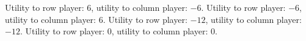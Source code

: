 \documentclass{exam}
\begin{document}
\begin{questions}
    \begin{checkboxes}
        \choice  Utility to row player: \(6\), utility to column player: \(-6\).
        \choice  Utility to row player: \(-6\), utility to column player: \(6\).
        \choice  Utility to row player: \(-12\), utility to column player: \(-12\).
        \choice  Utility to row player: \(0\), utility to column player: \(0\).
    \end{checkboxes}

\end{questions}
\end{document}
